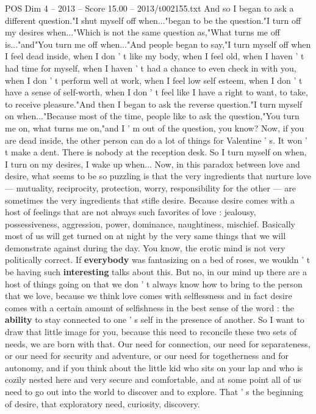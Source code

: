 \begin{textsample}{POS Dim 4 – 2013 – Score 15.00 – 2013/t002155.txt}
And so I began to ask a different question."I shut myself off when..."began to be the question."I turn off my desires when..."Which is not the same question as,"What turns me off is..."and"You turn me off when..."And people began to say,"I turn myself off when I feel dead inside, when I don ' t like my body, when I feel old, when I haven ' t had time for myself, when I haven ' t had a chance to even check in with you, when I don ' t perform well at work, when I feel low self esteem, when I don ' t have a sense of self-worth, when I don ' t feel like I have a right to want, to take, to receive pleasure."And then I began to ask the reverse question."I turn myself on when..."Because most of the time, people like to ask the question,"You turn me on, what turns me on,"and I ' m out of the question, you know?
Now, if you are dead inside, the other person can do a lot of things for Valentine ' s.
It won ' t make a dent.
There is nobody at the reception desk.
So I turn myself on when, I turn on my desires, I wake up when...
Now, in this paradox between love and desire, what seems to be so puzzling is that the very ingredients that nurture love — mutuality, reciprocity, protection, worry, responsibility for the other — are sometimes the very ingredients that stifle desire.
Because desire comes with a host of feelings that are not always such favorites of love : jealousy, possessiveness, aggression, power, dominance, naughtiness, mischief.
Basically most of us will get turned on at night by the very same things that we will demonstrate against during the day.
You know, the erotic mind is not very politically correct.
If \textbf{everybody} was fantasizing on a bed of roses, we wouldn ' t be having such \textbf{interesting} talks about this.
But no, in our mind up there are a host of things going on that we don ' t always know how to bring to the person that we love, because we think love comes with selflessness and in fact desire comes with a certain amount of selfishness in the best sense of the word : the \textbf{ability} to stay connected to one ' s self in the presence of another.
So I want to draw that little image for you, because this need to reconcile these two sets of needs, we are born with that.
Our need for connection, our need for separateness, or our need for security and adventure, or our need for togetherness and for autonomy, and if you think about the little kid who sits on your lap and who is cozily nested here and very secure and comfortable, and at some point all of us need to go out into the world to discover and to explore.
That ' s the beginning of desire, that exploratory need, curiosity, discovery.

\end{textsample}
